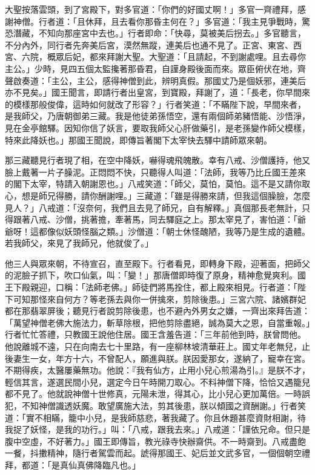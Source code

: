 大聖按落雲頭，到了宮殿下，對多官道：「你們的好國丈啊！」多官一齊禮拜，感謝神僧。行者道：「且休拜，且去看你那昏主何在？」多官道：「我主見爭戰時，驚恐潛藏，不知向那座宮中去也。」行者即命：「快尋，莫被美后拐去。」多官聽言，不分內外，同行者先奔美后宮，漠然無蹤，連美后也通不見了。正宮、東宮、西宮、六院，概眾后妃，都來拜謝大聖。大聖道：「且請起，不到謝處哩。且去尋你主公。」少時，見四五個太監攙著那昏君，自謹身殿後面而來。眾臣俯伏在地，齊聲啟奏道：「主公，主公，感得神僧到此，辨明真假。那國丈乃是個妖邪，連美后亦不見矣。」國王聞言，即請行者出皇宮，到寶殿，拜謝了，道：「長老，你早間來的模樣那般俊偉，這時如何就改了形容？」行者笑道：「不瞞陛下說，早間來者，是我師父，乃唐朝御弟三藏。我是他徒弟孫悟空，還有兩個師弟豬悟能、沙悟淨，見在金亭館驛。因知你信了妖言，要取我師父心肝做藥引，是老孫變作師父模樣，特來此降妖也。」那國王聞說，即傳旨著閣下太宰快去驛中請師眾來朝。

那三藏聽見行者現了相，在空中降妖，嚇得魂飛魄散。幸有八戒、沙僧護持，他又臉上戴著一片子臊泥。正悶悶不快，只聽得人叫道：「法師，我等乃比丘國王差來的閣下太宰，特請入朝謝恩也。」八戒笑道：「師父，莫怕，莫怕。這不是又請你取心，想是師兄得勝，請你酬謝哩。」三藏道：「雖是得勝來請，但我這個臊臉，怎麼見人？」八戒道：「沒奈何，我們且去見了師兄，自有解釋。」真個那長老無計，只得跟著八戒、沙僧，挑著擔，牽著馬，同去驛庭之上。那太宰見了，害怕道：「爺爺呀！這都像似妖頭怪腦之類。」沙僧道：「朝士休怪醜陋，我等乃是生成的遺體。若我師父，來見了我師兄，他就俊了。」

他三人與眾來朝，不待宣召，直至殿下。行者看見，即轉身下殿，迎著面，把師父的泥臉子抓下，吹口仙氣，叫：「變！」那唐僧即時復了原身，精神愈覺爽利。國王下殿親迎，口稱：「法師老佛。」師徒們將馬拴住，都上殿來相見。行者道：「陛下可知那怪來自何方？等老孫去與你一併擒來，剪除後患。」三宮六院、諸嬪群妃都在那翡翠屏後；聽見行者說剪除後患，也不避內外男女之嫌，一齊出來拜告道：「萬望神僧老佛大施法力，斬草除根，把他剪除盡絕，誠為莫大之恩，自當重報。」行者忙忙答禮，只教國王說他住居。國王含羞告道：「三年前他到時，朕曾問他。他說離城不遠，只在向南去七十里路，有一座柳林坡清華莊上。國丈年老無兒，止後妻生一女，年方十六，不曾配人，願進與朕。朕因愛那女，遂納了，寵幸在宮。不期得疾，太醫屢藥無功。他說：『我有仙方，止用小兒心煎湯為引。』是朕不才，輕信其言，遂選民間小兒，選定今日午時開刀取心。不料神僧下降，恰恰又遇籠兒都不見了。他就說神僧十世修真，元陽未泄，得其心，比小兒心更加萬倍。一時誤犯，不知神僧識透妖魔。敢望廣施大法，剪其後患，朕以傾國之資酬謝。」行者笑道：「實不相瞞，籠中小兒，是我師慈悲，著我藏了。你且休題甚麼資財相謝，待我捉了妖怪，是我的功行。」叫：「八戒，跟我去來。」八戒道：「謹依兄命。但只是腹中空虛，不好著力。」國王即傳旨，教光祿寺快辦齋供。不一時齋到。八戒盡飽一餐，抖擻精神，隨行者駕雲而起。諕得那國王、妃后並文武多官，一個個朝空禮拜，都道：「是真仙真佛降臨凡也。」

